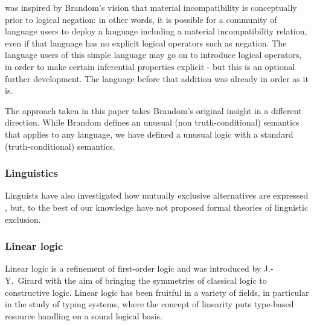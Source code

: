 \ELFULL{} was inspired by Brandom's vision that material
incompatibility is conceptually prior to logical negation: in other
words, it is possible for a community of language users to deploy a
language including a material incompatibility relation, even if that
language has no explicit logical operators such as negation.  The
language users of this simple language may go on to introduce logical
operators, in order to make certain inferential properties explicit -
but this is an optional further development.  The language before that
addition was already in order as it is.

The approach taken in this paper takes Brandom's original insight in a
different direction.  While Brandom defines an unusual (non
truth-conditional) semantics that applies to any language, we have
defined a unusual logic with a standard (truth-conditional) semantics.

\subsubsection{Linguistics}

Linguists have also investigated how mutually exclusive alternatives
are expressed \cite{OKeeffeA:rouhanocl}, but, to the best of our
knowledge have not proposed formal theories of linguistic exclusion.

\subsubsection{Linear logic}

Linear logic \cite{GirardJY:linlog,GirardJY:protyp} is a refinement of
first-order logic and was introduced by J.-Y.~Girard with the aim of
bringing the symmetries of classical logic to constructive
logic. Linear logic has been fruitful in a variety of fields, in
particular in the study of typing systems, where the concept of
linearity puts type-based resource handling on a sound logical basis.

